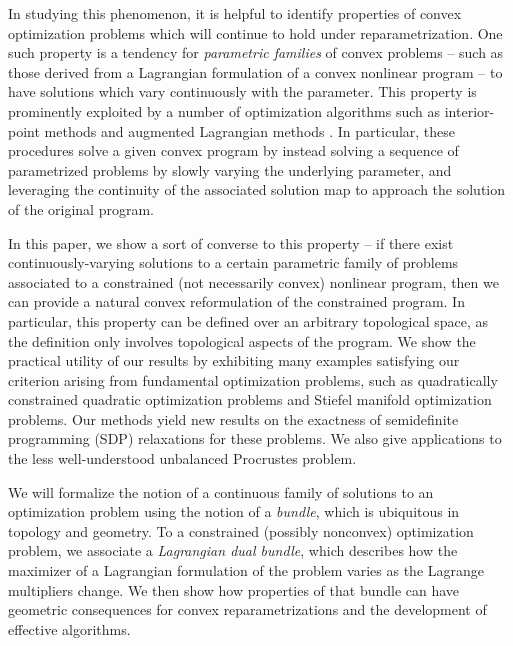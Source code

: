 \documentclass{article}
\numberwithin{equation}{section}
\newcommand{\demph}[1]{\emph{{\color{RoyalBlue}#1}}}
\begin{document}
In studying this phenomenon, it is helpful to identify properties of convex optimization problems which will continue to hold under reparametrization.  One such property is a tendency for \emph{parametric families} of convex  problems -- such as those derived from a Lagrangian formulation of a convex nonlinear program -- to have solutions which vary continuously with the parameter.  This property is prominently exploited by a number of optimization algorithms such as interior-point methods and augmented Lagrangian methods \cite{nocedal2006numerical}.  In particular, these procedures solve a given convex program by instead solving a sequence of parametrized problems by slowly varying the underlying parameter, and leveraging the continuity of the associated solution map to approach the solution of the original program.

In this paper, we show a sort of converse to this property -- if there exist continuously-varying solutions to a certain parametric family of problems associated to a constrained (not necessarily convex) nonlinear program, then we can provide a natural convex reformulation of the constrained program. In particular, this property can be defined over an arbitrary topological space, as the definition only involves topological aspects of the program. We show the practical utility of our results by exhibiting many examples satisfying our criterion arising from fundamental optimization problems, such as quadratically constrained quadratic optimization problems and Stiefel manifold optimization problems. Our methods yield new results on the exactness of semidefinite programming (SDP) relaxations for these problems. We also give applications to the less well-understood unbalanced Procrustes problem. 

We will formalize the notion of a continuous family of solutions to an optimization problem using the notion of a \demph{bundle}, which is ubiquitous in topology and geometry. To a constrained (possibly nonconvex) optimization problem, we associate a \demph{Lagrangian dual bundle}, which describes how the maximizer of a Lagrangian formulation of the problem varies as the Lagrange multipliers change. We then show how properties of that bundle can have geometric consequences for convex reparametrizations and the development of effective algorithms.
\end{document}
